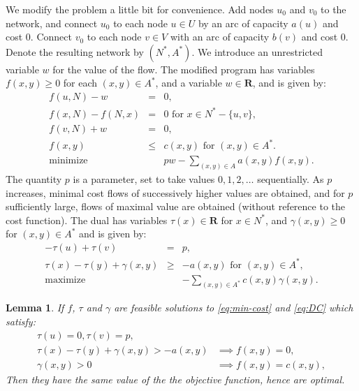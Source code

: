 \documentclass{amsbook}
\newcommand{\RR}{\mathbf R}
\newtheorem{lemma}[theorem]{Lemma}
\theoremstyle{definition}
\theoremstyle{remark}
\begin{document}
We modify the problem a little bit for convenience.
Add nodes $u_0$ and $v_0$ to the network, and connect $u_0$ to each node $u\in U$ by an arc of capacity $a(u)$ and cost $0$.
Connect $v_0$ to each node $v\in V$ with an arc of capacity $b(v)$ and cost $0$.
Denote the resulting network by $(N^*,A^*)$.
We introduce an unrestricted variable $w$ for the value of the flow.
The modified program has variables $f(x,y)\geq 0$ for each $(x,y)\in A^*$, and a variable $w\in \RR$, and is given by:
\begin{equation}
  \tag{C}
  \label{eq:min-cost}
  \begin{array}{rcl}
    f(u,N)-w&=&0,\\
    f(x,N)-f(N,x)&=&0 \text{ for }x\in N^*-\{u,v\},\\
    f(v,N)+w&=&0,\\
    f(x,y)&\leq&c(x,y) \text{ for }(x,y)\in A^*.\\
    \hline
    \text{minimize}&&pw-\sum_{(x,y)\in A} a(x,y)f(x,y).
  \end{array}
\end{equation}
The quantity $p$ is a parameter, set to take values $0,1,2,\dotsc$ sequentially.
As $p$ increases, minimal cost flows of successively higher values are obtained, and for $p$ sufficiently large, flows of maximal value are obtained (without reference to the cost function).
The dual has variables $\tau(x)\in \RR$ for $x\in N^*$, and $\gamma(x,y)\geq 0$ for $(x,y)\in A^*$ and is given by:
\begin{equation}
  \label{eq:DC}
  \tag{DC}
  \begin{array}{rcl}
    -\tau(u)+\tau(v) & = & p,\\
    \tau(x)-\tau(y)+\gamma(x,y)&\geq& -a(x,y) \text{ for }(x,y)\in A^*,\\
    \hline
    \text{maximize}&&-\sum_{(x,y)\in A^*} c(x,y)\gamma(x,y).
  \end{array}
\end{equation}
\begin{lemma}
  \label{lemma:cost-optimality}
  If $f$, $\tau$ and $\gamma$ are feasible solutions to \eqref{eq:min-cost} and \eqref{eq:DC} which satisfy:
  \begin{align*}
    \tau(u)=0, \tau(v)=p,&\\
    \tau(x)-\tau(y)+\gamma(x,y)>-a(x,y) & \implies f(x,y)=0,\\
    \gamma(x,y)>0 & \implies f(x,y)=c(x,y),
  \end{align*}
  Then they have the same value of the the objective function, hence are optimal.
\end{lemma}
\end{document}
